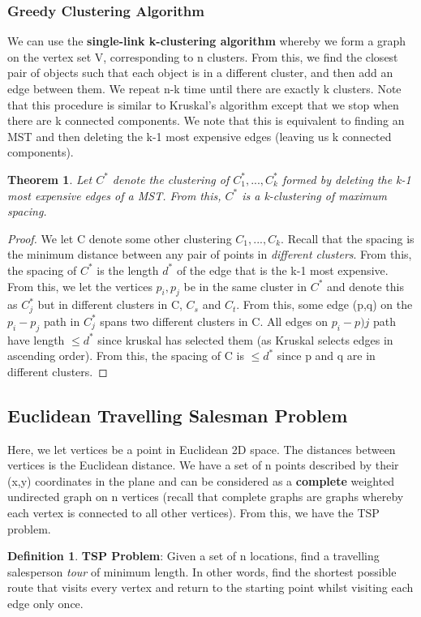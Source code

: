 \documentclass[11pt, oneside]{article}
\newtheorem{theorem}{Theorem}
\theoremstyle{definition}
\newtheorem{definition}{Definition}[section]
\begin{document}
\subsubsection{Greedy Clustering Algorithm}
We can use the \textbf{single-link k-clustering algorithm} whereby we form a graph on the vertex set V, corresponding to n clusters. From this, we find the closest pair of objects such that each object is in a different cluster, and then add an edge between them. We repeat n-k time until there are exactly k clusters. Note that this procedure is similar to Kruskal's algorithm except that we stop when there are k connected components. We note that this is equivalent to finding an MST and then deleting the k-1 most expensive edges (leaving us k connected components).

\begin{theorem}
  Let $C^*$ denote the clustering of $C_1^*,...,C_k^*$ formed by deleting the k-1 most expensive edges of a MST. From this, $C^*$ is a k-clustering of maximum spacing.
  \end{theorem}
\begin{proof}
  We let C denote some other clustering $C_1,...,C_k$. Recall that the spacing is the minimum distance between any pair of points in \textit{different clusters}. From this, the spacing of $C^*$ is the length $d^*$ of the edge that is the k-1 most expensive. From this, we let the vertices $p_i,p_j$ be in the same cluster in $C^*$ and denote this as $C_j^*$ but in different clusters in C, $C_s$ and $C_t$. From this, some edge (p,q) on the $p_i-p_j$ path in $C_j^*$ spans two different clusters in C. All edges on $p_i-p)j$ path have length $\leq d^*$ since kruskal has selected them (as Kruskal selects edges in ascending order). From this, the spacing of C is $\leq d^*$ since p and q are in different clusters.
\end{proof}

\subsection{Euclidean Travelling Salesman Problem}
Here, we let vertices be a point in Euclidean 2D space. The distances between vertices is the Euclidean distance. We have a set of n points described by their (x,y) coordinates in the plane and can be considered as a \textbf{complete} weighted undirected graph on n vertices (recall that complete graphs are graphs whereby each vertex is connected to all other vertices). From this, we have the TSP problem.
\begin{definition}
  \textbf{TSP Problem}: Given a set of n locations, find a travelling salesperson \textit{tour} of minimum length. In other words, find the shortest possible route that visits every vertex and return to the starting point whilst visiting each edge only once.
\end{definition}
\end{document}
